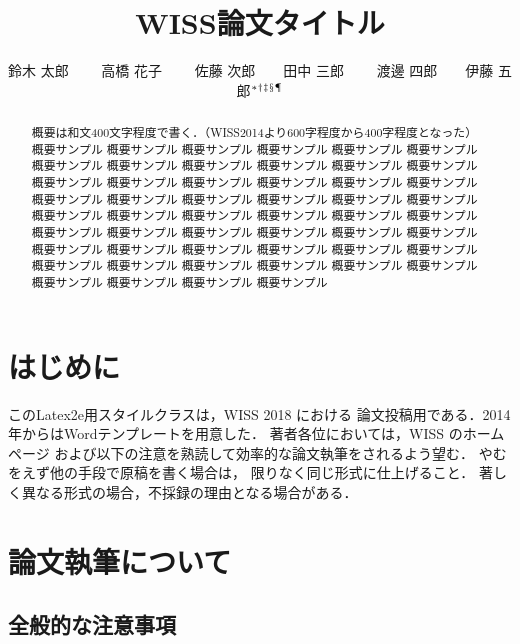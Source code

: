 \documentclass[twoside]{wiss}
\begin{document}
\title{WISS論文タイトル}
\etitle{}%
%
%
%
\author{鈴木 太郎 　　高橋 花子
　　佐藤 次郎　　田中 三郎
　　渡邊 四郎　　伊藤 五郎${}^* {}^\dag {}^\ddag {}^\mathsection
{}^\mathparagraph$}

\begin{abstract}
概要は和文400文字程度で書く．（WISS2014より600字程度から400字程度となった）
概要サンプル 概要サンプル 概要サンプル 概要サンプル 概要サンプル 概要サンプル
概要サンプル 概要サンプル 概要サンプル 概要サンプル 概要サンプル 概要サンプル
概要サンプル 概要サンプル 概要サンプル 概要サンプル 概要サンプル 概要サンプル
概要サンプル 概要サンプル 概要サンプル 概要サンプル 概要サンプル 概要サンプル
概要サンプル 概要サンプル 概要サンプル 概要サンプル 概要サンプル 概要サンプル
概要サンプル 概要サンプル 概要サンプル 概要サンプル 概要サンプル 概要サンプル
概要サンプル 概要サンプル 概要サンプル 概要サンプル 概要サンプル 概要サンプル
概要サンプル 概要サンプル 概要サンプル 概要サンプル 概要サンプル 概要サンプル
概要サンプル 概要サンプル 概要サンプル 概要サンプル
\end{abstract}

\maketitle

\section{はじめに}

このLatex2e用スタイルクラスは，WISS 2018 における
論文投稿用である．2014年からはWordテンプレートを用意した．
著者各位においては，WISS のホームページ\cite{wiss}
および以下の注意を熟読して効率的な論文執筆をされるよう望む．
やむをえず他の手段で原稿を書く場合は，
限りなく同じ形式に仕上げること．
著しく異なる形式の場合，不採録の理由となる場合がある．

\section{論文執筆について}

\subsection{全般的な注意事項}
\end{document}
